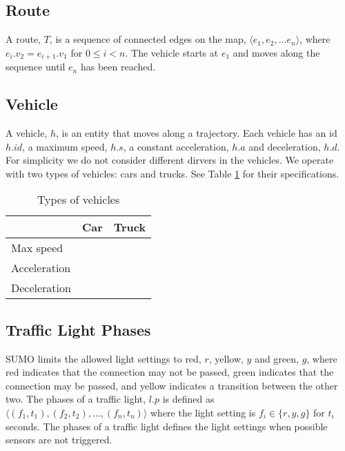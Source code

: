 \begin{comment}
\subsection{Trajectory}
A trajectory, $T$, is a sequence of connected edges on the map, $\langle e_1, e_2, \dots e_n \rangle$, where $e_i.v_2 = e_{i+1}.v_1$ for $0\leq i< n$.
The vehicle starts at $e_1$ and moves along the sequence until $e_n$ has been reached.
\end{comment}

\subsection{Route}
A route, $T$, is a sequence of connected edges on the map, $\langle e_1, e_2, \dots e_n \rangle$, where $e_i.v_2 = e_{i+1}.v_1$ for $0\leq i< n$.
The vehicle starts at $e_1$ and moves along the sequence until $e_n$ has been reached.


\subsection{Vehicle}
A vehicle, $h$, is an entity that moves along a trajectory.
Each vehicle has an id $h.id$, a maximum speed, $h.s$, a constant acceleration, $h.a$ and deceleration, $h.d$.
For simplicity we do not consider different dirvers in the vehicles.
We operate with two types of vehicles: cars and trucks. See Table \ref{table.vehicleTypes} for their specifications.
\begin{table}
\centering
\begin{tabular}{|l|l|l|}\hline
				& Car	& Truck \\\hline
Max speed 		& 		& \\\hline
Acceleration 	&		& \\\hline
Deceleration 	&		& \\\hline
\end{tabular}
\caption{Types of vehicles}\label{table.vehicleTypes}
\end{table}





\subsection{Traffic Light Phases}
SUMO limits the allowed light settings to red, $r$, yellow, $y$ and green, $g$, where red indicates that the connection may not be passed, green indicates that the connection may be passed, and yellow indicates a transition between the other two. 
The phases of a traffic light, $l.p$ is defined as $\langle(f_1, t_1),(f_2, t_2),\dots, (f_n, t_n) \rangle$ where the light setting is $f_i\in \{r, y, g\}$ for $t_i$ seconds.
The phases of a traffic light defines the light settings when possible sensors are not triggered. 


